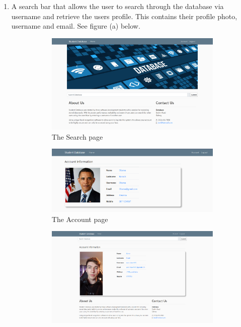 \documentclass{article}
\begin{document}
\begin{enumerate}
    \newpage
    \item A search bar that allows the user to search through the database  via username and retrieve the users profile.
    This contains their profile photo, username and email. See figure (a) below.
    \begin{figure}[h!]
      \begin{subfigure}[b]{0.5\textwidth}
        \includegraphics[width=\textwidth]{images/SamplePictures/Search.png}
        \caption{The Search page}
        \label{fig:1}
      \end{subfigure}
      \begin{subfigure}[b]{0.6\textwidth}
        \includegraphics[width=\textwidth]{images/SamplePictures/Account.png}
        \caption{The Account page}
        \label{fig:2}
      \end{subfigure}
      \begin{subfigure}[b]{0.6\textwidth}
        \includegraphics[width=\textwidth]{images/SamplePictures/Conor.png}

\end{subfigure}
\end{figure}
\end{enumerate}
\end{document}
